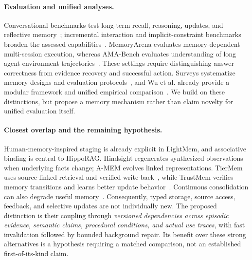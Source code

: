 \paragraph{Evaluation and unified analyses.}
Conversational benchmarks test long-term recall, reasoning, updates, and reflective memory~\citep{mrw_locomo,mrw_longmemeval,mrw_membench}; incremental interaction and implicit-constraint benchmarks broaden the assessed capabilities~\citep{mrw_memoryagentbench,mrw_locomo_plus}. MemoryArena evaluates memory-dependent multi-session execution, whereas AMA-Bench evaluates understanding of long agent-environment trajectories~\citep{mrw_memoryarena,mrw_amabench}. These settings require distinguishing answer correctness from evidence recovery and successful action. Surveys systematize memory designs and evaluation protocols~\citep{mrw_survey2024,mrw_survey}, and Wu et al. already provide a modular framework and unified empirical comparison~\citep{mrw_memoryeab}. We build on these distinctions, but propose a memory mechanism rather than claim novelty for unified evaluation itself.

\paragraph{Closest overlap and the remaining hypothesis.}
Human-memory-inspired staging is already explicit in LightMem, and associative
binding is central to HippoRAG. Hindsight regenerates synthesized observations
when underlying facts change; A-MEM evolves linked representations. TierMem
uses source-linked retrieval and verified write-back~\citep{brain_tiermem},
while TrustMem verifies memory transitions and learns better update
behavior~\citep{brain_trustmem}. Continuous consolidation can also degrade
useful memory~\citep{brain_faulty}. Consequently, typed storage, source access,
feedback, and selective updates are not individually new. The proposed
distinction is their coupling through \emph{versioned dependencies across
episodic evidence, semantic claims, procedural conditions, and actual use
traces}, with fast invalidation followed by bounded background repair. Its
benefit over these strong alternatives is a hypothesis requiring a matched
comparison, not an established first-of-its-kind claim.
